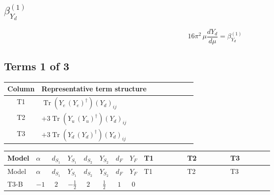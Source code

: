 \documentclass[8pt]{article}
\begin{document}
\begin{landscape}
\section*{$\beta_{Y_d}^{(1)}$}
\[16\pi^2\,\mu\frac{d Y_d}{d\mu}=\beta_{Y_d}^{(1)}\]
\subsection*{Terms 1 of 3}
\begin{center}
\begin{tabular}{@{}c >{\raggedright\arraybackslash}p{0.82\linewidth}@{}}
\toprule
Column & Representative term structure \\
\midrule
T1 & \(\displaystyle \operatorname{Tr}\!\left({Y_e}\,\left({Y_e}\right)^{\dagger}\right) \left({Y_d}\right)_{ij}\) \\
\midrule
T2 & \(\displaystyle +3 \operatorname{Tr}\!\left({Y_u}\,\left({Y_u}\right)^{\dagger}\right) \left({Y_d}\right)_{ij}\) \\
\midrule
T3 & \(\displaystyle +3 \operatorname{Tr}\!\left({Y_d}\,\left({Y_d}\right)^{\dagger}\right) \left({Y_d}\right)_{ij}\) \\
\midrule
\bottomrule
\end{tabular}
\end{center}
\smallskip
\tiny
\begin{longtable}{@{}llcccccc >{\raggedright\arraybackslash}p{0.21\linewidth} >{\raggedright\arraybackslash}p{0.21\linewidth} >{\raggedright\arraybackslash}p{0.21\linewidth}@{}}
\toprule
Model & $\alpha$ & $d_{S_1}$ & $Y_{S_1}$ & $d_{S_2}$ & $Y_{S_2}$ & $d_F$ & $Y_F$ & T1 & T2 & T3 \\
\midrule
\endfirsthead
\toprule
Model & $\alpha$ & $d_{S_1}$ & $Y_{S_1}$ & $d_{S_2}$ & $Y_{S_2}$ & $d_F$ & $Y_F$ & T1 & T2 & T3 \\
\midrule
\endhead
T3-B & $-1$ & $2$ & $-\frac{1}{2}$ & $2$ & $\frac{1}{2}$ & $1$ & $0$ & \scriptsize\adjustbox{max width=\linewidth}{$\begin{gathered} \operatorname{Tr}\!\left({Y_e}\,\left({Y_e}\right)^{\dagger}\right) \left({Y_d}\right)_{ij}\end{gathered}$} & \scriptsize\adjustbox{max width=\linewidth}{$\begin{gathered} +3 \operatorname{Tr}\!\left({Y_u}\,\left({Y_u}\right)^{\dagger}\right) \left({Y_d}\right)_{ij}\end{gathered}$} & \scriptsize\adjustbox{max width=\linewidth}{$\begin{gathered} +3 \operatorname{Tr}\!\left({Y_d}\,\left({Y_d}\right)^{\dagger}\right) \left({Y_d}\right)_{ij}\end{gathered}$} \\

\end{longtable}
\end{landscape}
\end{document}
